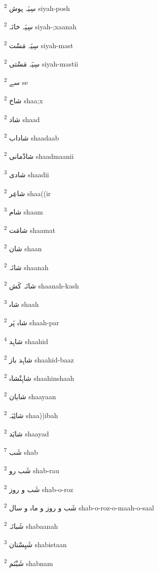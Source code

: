 \documentclass[12pt]{article}
\begin{document}
\begin{multicols}{5}
{\ur سِیَہ پوش}   \textsuperscript{2} siyah-posh

{\ur سِیَہ خانَہ}   \textsuperscript{2} siyah-;xaanah

{\ur سِیَہ مَسْت}   \textsuperscript{2} siyah-mast

{\ur سِیَہ مَسْتی}   \textsuperscript{2} siyah-mastii

{\ur سے}   \textsuperscript{2} se

{\ur شاخ}   \textsuperscript{2} shaa;x

{\ur شاد}   \textsuperscript{2} shaad

{\ur شاداب}   \textsuperscript{2} shaadaab

{\ur شادْمانی}   \textsuperscript{2} shaadmaanii

{\ur شادی}   \textsuperscript{3} shaadii

{\ur شاعِر}   \textsuperscript{2} shaa((ir

{\ur شام}   \textsuperscript{3} shaam

{\ur شامَت}   \textsuperscript{2} shaamat

{\ur شان}   \textsuperscript{2} shaan

{\ur شانَہ}   \textsuperscript{2} shaanah

{\ur شانَہ کَش}   \textsuperscript{2} shaanah-kash

{\ur شاہ}   \textsuperscript{3} shaah

{\ur شاہ پَر}   \textsuperscript{2} shaah-par

{\ur شاہِد}   \textsuperscript{4} shaahid

{\ur شاہِد باز}   \textsuperscript{2} shaahid-baaz

{\ur شاہِنْشاہ}   \textsuperscript{2} shaahinshaah

{\ur شایان}   \textsuperscript{2} shaayaan

{\ur شائِبَہ}   \textsuperscript{2} shaa))ibah

{\ur شایَد}   \textsuperscript{2} shaayad

{\ur شَب}   \textsuperscript{7} shab

{\ur شَب رو}   \textsuperscript{2} shab-rau

{\ur شَب و روز}   \textsuperscript{2} shab-o-roz

{\ur شَب و روز و ماہ و سال}   \textsuperscript{2} shab-o-roz-o-maah-o-saal

{\ur شَبانَہ}   \textsuperscript{2} shabaanah

{\ur شَبِسْتان}   \textsuperscript{3} shabistaan

{\ur شَبْنَم}   \textsuperscript{2} shabnam


\end{multicols}
\end{document}

